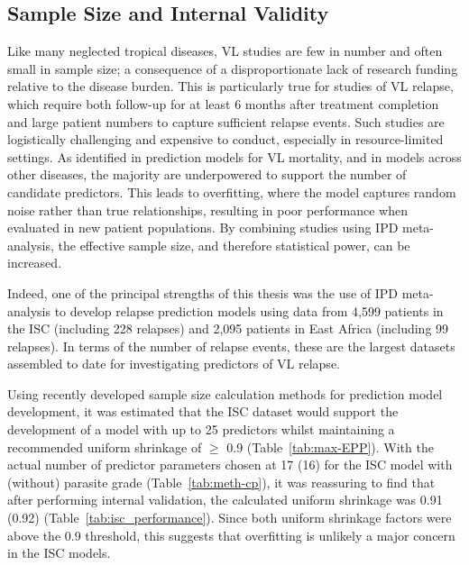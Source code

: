 \subsection{Sample Size and Internal Validity}

Like many neglected tropical diseases, VL studies are few in number and often small in sample size; a consequence of a disproportionate lack of research funding relative to the disease burden. This is particularly true for studies of VL relapse, which require both follow-up for at least 6 months after treatment completion and large patient numbers to capture sufficient relapse events. Such studies are logistically challenging and expensive to conduct, especially in resource-limited settings\cite{alves2018}. As identified in prediction models for VL mortality\cite{wilson2026}, and in models across other diseases\cite{moons2015,wynants2020,peetluk2021,njim2019}, the majority are underpowered to support the number of candidate predictors. This leads to overfitting, where the model captures random noise rather than true relationships, resulting in poor performance when evaluated in new patient populations\cite{moons2015}. By combining studies using IPD meta-analysis, the effective sample size, and therefore statistical power, can be increased\cite{debray2023}.

Indeed, one of the principal strengths of this thesis was the use of IPD meta-analysis to develop relapse prediction models using data from 4,599 patients in the ISC (including 228 relapses) and 2,095 patients in East Africa (including 99 relapses). In terms of the number of relapse events, these are the largest datasets assembled to date for investigating predictors of VL relapse.

Using recently developed sample size calculation methods for prediction model development\cite{riley2019B}, it was estimated that the ISC dataset would support the development of a model with up to 25 predictors whilst maintaining a recommended uniform shrinkage of $\geq$ 0.9 (Table~\ref{tab:max-EPP}). With the actual number of predictor parameters chosen at 17 (16) for the ISC model with (without) parasite grade (Table~\ref{tab:meth-cp}), it was reassuring to find that after performing internal validation, the calculated uniform shrinkage was 0.91 (0.92) (Table~\ref{tab:isc_performance}). Since both uniform shrinkage factors were above the 0.9 threshold, this suggests that overfitting is unlikely a major concern in the ISC models.

